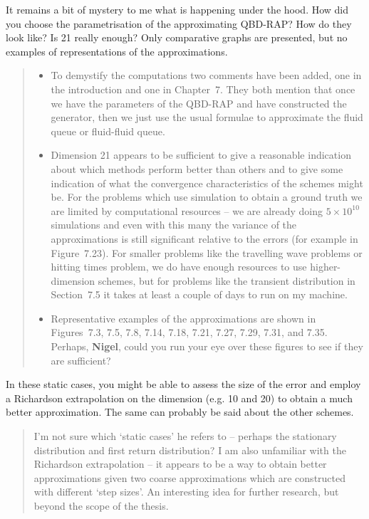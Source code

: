 \documentclass[a4paper]{article}
\begin{document}
It remains a bit of mystery to me what is happening under the hood. How did you choose the parametrisation of the approximating QBD-RAP? How do they look like? Is 21 really enough? Only comparative graphs are presented, but no examples of representations of the approximations.
\begin{quote}
    \begin{itemize}
        \item To demystify the computations two comments have been added, one in the introduction and one in Chapter~7. They both mention that once we have the parameters of the QBD-RAP and have constructed the generator, then we just use the usual formulae to approximate the fluid queue or fluid-fluid queue. 
        \item Dimension 21 appears to be sufficient to give a reasonable indication about which methods perform better than others and to give some indication of what the convergence characteristics of the schemes might be. For the problems which use simulation to obtain a ground truth we are limited by computational resources -- we are already doing \(5\times 10^10\) simulations and even with this many the variance of the approximations is still significant relative to the errors (for example in Figure~7.23). For smaller problems like the travelling wave problems or hitting times problem, we do have enough resources to use higher-dimension schemes, but for problems like the transient distribution in Section~7.5 it takes at least a couple of days to run on my machine. 
        \item Representative examples of the approximations are shown in Figures~7.3, 7.5, 7.8, 7.14, 7.18, 7.21, 7.27, 7.29, 7.31, and 7.35. Perhaps, \textbf{Nigel}, could you run your eye over these figures to see if they are sufficient? 
    \end{itemize}
\end{quote}


In these static cases, you might be able to assess the size of the error and employ a Richardson extrapolation on the dimension (e.g. 10 and 20) to obtain a much better approximation. The same can probably be said about the other schemes.
\begin{quote}
    I'm not sure which `static cases' he refers to -- perhaps the stationary distribution and first return distribution? I am also unfamiliar with the Richardson extrapolation -- it appears to be a way to obtain better approximations given two coarse approximations which are constructed with different `step sizes'. An interesting idea for further research, but beyond the scope of the thesis. 
\end{quote}
\end{document}
